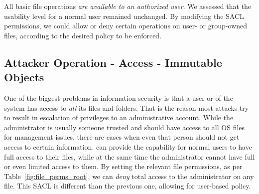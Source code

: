 \par All basic file operations \emph{are available to an authorized user}. We assessed that the usability level for a normal user remained unchanged. By modifying the \ac{SACL} permissions, we could allow or deny certain operations on user- or group-owned files, according to the desired policy to be enforced.

\subsection{Attacker Operation -  Access - Immutable Objects}

\par One of the biggest problems in information security is that a  user or  of the system has access to \emph{all} its files and folders. That is the reason most attacks try to result in escalation of privileges to an administrative account. While the administrator is usually someone trusted and should have access to all \ac{OS} files for management issues, there are cases when even that person should not get access to certain information.  can provide the capability for normal users to have full access to their files, while at the same time the administrator cannot have full or even limited access to them. By setting the relevant file permissions, as per Table~\ref{fig:file_perms_root}, we can \emph{deny} total access to the administrator on any file. This \ac{SACL} is different than the previous one, allowing for user-based policy.

